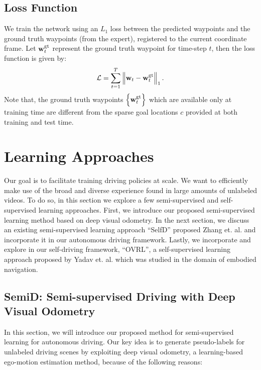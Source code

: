 \documentclass[letterpaper, 12pt]{book}
\theoremstyle{definition}
\theoremstyle{definition}
\theoremstyle{definition}
\theoremstyle{definition}
\theoremstyle{definition}
\begin{document}
\subsection{Loss Function \label{org83b2fdf}}
\label{sec:org9ff27af}
We train the network using an \(L_{1}\) loss between the predicted waypoints and
the ground truth waypoints (from the expert), registered to the current
coordinate frame. Let \(\textbf w_{t}^{\text{gt}}\) represent the ground truth
waypoint for time-step \(t\), then the loss function is given by:
\[\mathcal{L}=\sum_{t=1}^{T}\left\| \textbf w_{t}-\textbf w_{t}^{\text{gt}} \right\|_{1}.\] Note that, the
ground truth waypoints \(\left\lbrace \textbf w_{t}^{\text{gt}} \right\rbrace\) which are available only at
training time are different from the sparse goal locations \(c\) provided at
both training and test time.

\section{Learning Approaches \label{org96f2539}}
\label{sec:orge1db0fe}
Our goal is to facilitate training driving policies at scale. We want to
efficiently make use of the broad and diverse experience found in large amounts
of unlabeled videos. To do so, in this section we explore a few semi-supervised
and self-supervised learning approaches. First, we introduce our proposed
semi-supervised learning method based on deep visual odometry. In the next
section, we discuss an existing semi-supervised learning approach ``SelfD''
proposed Zhang et. al. \cite{Zhang2022a} and incorporate it in our autonomous
driving framework. Lastly, we incorporate and explore in our self-driving
framework, ``OVRL'', a self-supervised learning approach proposed by Yadav
et. al. \cite{Yadav2022} which was studied in the domain of embodied navigation.

\subsection{SemiD: Semi-supervised Driving with Deep Visual Odometry \label{org0857abd}}
\label{sec:org408e00d}
In this section, we will introduce our proposed method for semi-supervised
learning for autonomous driving. Our key idea is to generate pseudo-labels for
unlabeled driving scenes by exploiting deep visual odometry, a learning-based
ego-motion estimation method, because of the following reasons:
\end{document}

